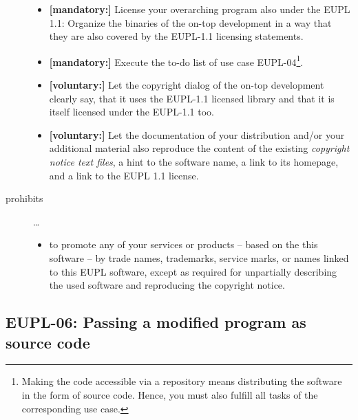 \begin{description}
\begin{itemize}
  \item \textbf{[mandatory:]} License your overarching program also under the
  EUPL 1.1: Organize the binaries of the on-top development in a way that they
  are also covered by the EUPL-1.1 licensing statements.
  
  \item \textbf{[mandatory:]} Execute the to-do list of use case EUPL-04\footnote{
  Making the code accessible via a repository means distributing the software in
  the form of source code. Hence, you must also fulfill all tasks of the
  corresponding use case.}.
  
 \item \textbf{[voluntary:]} Let the copyright dialog of the on-top development
  clearly say, that it uses the EUPL-1.1 licensed library and that it is itself
  licensed under the EUPL-1.1 too.
 
  \item \textbf{[voluntary:]} Let the documentation of your distribution and/or
  your additional material also reproduce the content of the existing
  \emph{copyright notice text files}, a hint to the software name, a link to its
  homepage, and a link to the EUPL 1.1 license.
\end{itemize}

\item[prohibits] \ldots
\begin{itemize}
  \item to promote any of your services or products -- based on the this software
  -- by trade names, trademarks, service marks, or names linked to this EUPL
  software, except as required for unpartially describing the used software and
  reproducing the copyright notice.
\end{itemize}

\end{description}

\subsection{EUPL-06: Passing a modified program as source code}
\label{OSUC-04S-EUPL} 

